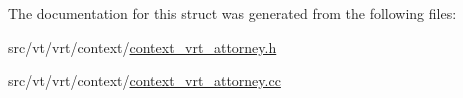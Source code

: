 The documentation for this struct was generated from the following files\+:\begin{DoxyCompactItemize}
\item 
src/vt/vrt/context/\hyperlink{context__vrt__attorney_8h}{context\+\_\+vrt\+\_\+attorney.\+h}\item 
src/vt/vrt/context/\hyperlink{context__vrt__attorney_8cc}{context\+\_\+vrt\+\_\+attorney.\+cc}\end{DoxyCompactItemize}
